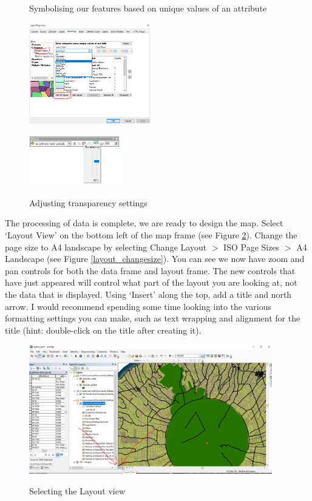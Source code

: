 \documentclass{article}
\begin{document}
\begin{figure}[h]
  \centering
  \begin{minipage}[b]{0.5\textwidth}
    \centering
    \caption{Symbolising our features based on unique values of an attribute}
    \includegraphics[width=200px]{images/part1/symbology_uniquevalues.PNG}
    \label{symbology_uniquevalues}
  \end{minipage}
  \hfill
  \begin{minipage}[b]{0.4\textwidth}
    \centering
    \caption{Adjusting transparency settings}
    \includegraphics[width=150px]{images/part1/transparency.PNG}
    \label{transparency}
  \end{minipage}
\end{figure}

The processing of data is complete, we are ready to design the map. Select `Layout View' on the bottom left of the map frame (see Figure \ref{layoutview}). Change the page size to A4 landscape by selecting Change Layout $>$ ISO Page Sizes $>$ A4 Landscape (see Figure \ref{layout_changesize}). You can see we now have zoom and pan controls for both the data frame and layout frame. The new controls that have just appeared will control what part of the layout you are looking at, not the data that is displayed. Using `Insert' along the top, add a title and north arrow. I would recommend spending some time looking into the various formatting settings you can make, such as text wrapping and alignment for the title (hint: double-click on the title after creating it). \\

\begin{figure}[h]
  \centering
  \caption{Selecting the Layout view}
  \includegraphics[width=400px]{images/part1/layoutview}
  \label{layoutview}
\end{figure} \pagebreak
\end{document}
